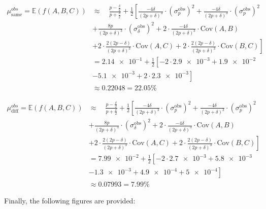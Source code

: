\begin{equation}
    \begin{aligned}
    \mu_{\text{same}}^{obs} = \mathbb{E}(f(A,B,C)) &\approx \quad \frac{p - \frac{\delta}{2}}{p + \frac{\delta}{2}} + \frac{1}{2} \left[ \frac{-4\delta}{(2p + \delta)^3}\cdot({\sigma^\text{obs}_p})^2 + \frac{-4\delta}{(2p + \delta)^3}\cdot({\sigma^\text{obs}_p})^2 \right. \\[2mm]
    & \left. + \frac{8p}{(2p + \delta)^3}\cdot({\sigma^\text{obs}_\delta})^2 + 2\cdot\frac{-4\delta}{(2p + \delta)^3}\cdot\text{Cov}(A,B) \right. \\[2mm] 
    & \left. + 2\cdot\frac{2(2p - \delta)}{(2p + \delta)^3}\cdot\text{Cov}(A,C) + 2\cdot\frac{2(2p - \delta)}{(2p + \delta)^3}\cdot\text{Cov}(B,C) \right]\\[10mm]
    & = \num{2.14e-1} + \frac{1}{2} \left[ -2\cdot\num{2.9e-3} + \num{1.9e-2}  \right. \\[2mm]
    & \left. - \num{5.1e-3} + 2\cdot\num{2.3e-3} \right] \\[10mm]
    & \approx 0.22048 = 22.05\%
    \end{aligned}
    \label{eq:mu_same}
\end{equation}

\begin{equation}
    \begin{aligned}
    \mu_{\text{diff}}^{obs} = \mathbb{E}(f(A,B,C)) &\approx \quad \frac{p - \frac{\delta}{2}}{p + \frac{\delta}{2}} + \frac{1}{2} \left[ \frac{-4\delta}{(2p + \delta)^3}\cdot({\sigma^\text{obs}_p})^2 + \frac{-4\delta}{(2p + \delta)^3}\cdot({\sigma^\text{obs}_p})^2 \right. \\[2mm]
    & \left. + \frac{8p}{(2p + \delta)^3}\cdot({\sigma^\text{obs}_\delta})^2 + 2\cdot\frac{-4\delta}{(2p + \delta)^3}\cdot\text{Cov}(A,B) \right. \\[2mm] 
    & \left. + 2\cdot\frac{2(2p - \delta)}{(2p + \delta)^3}\cdot\text{Cov}(A,C) + 2\cdot\frac{2(2p - \delta)}{(2p + \delta)^3}\cdot\text{Cov}(B,C) \right]\\[10mm]
    & = \num{7.99e-2} + \frac{1}{2} \left[ -2\cdot\num{2.7e-3} + \num{5.8e-3}  \right. \\[2mm]
    & \left. - \num{1.3e-3} + \num{4.9e-4} + \num{5e-4} \right] \\[10mm]
    & \approx 0.07993 = 7.99\%
    \end{aligned}
    \label{eq:mu_diff}
\end{equation}

Finally, the following figures are provided:

